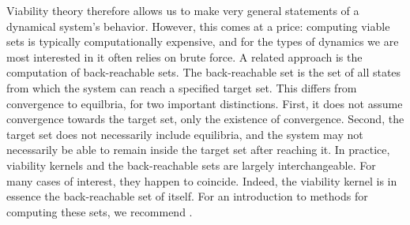 Viability theory therefore allows us to make very general statements of a dynamical system's behavior. However, this comes at a price: computing viable sets is typically computationally expensive, and for the types of dynamics we are most interested in it often relies on brute force. A related approach is the computation of back-reachable sets. The back-reachable set is the set of all states from which the system can reach a specified target set. This differs from convergence to equilbria, for two important distinctions. First, it does not assume convergence towards the target set, only the existence of convergence. Second, the target set does not necessarily include equilibria, and the system may not necessarily be able to remain inside the target set after reaching it. In practice, viability kernels and the back-reachable sets are largely interchangeable. For many cases of interest, they happen to coincide. Indeed, the viability kernel is in essence the back-reachable set of itself. For an introduction to methods for computing these sets, we recommend \cite{bansal2017hamilton,liniger2017real}.